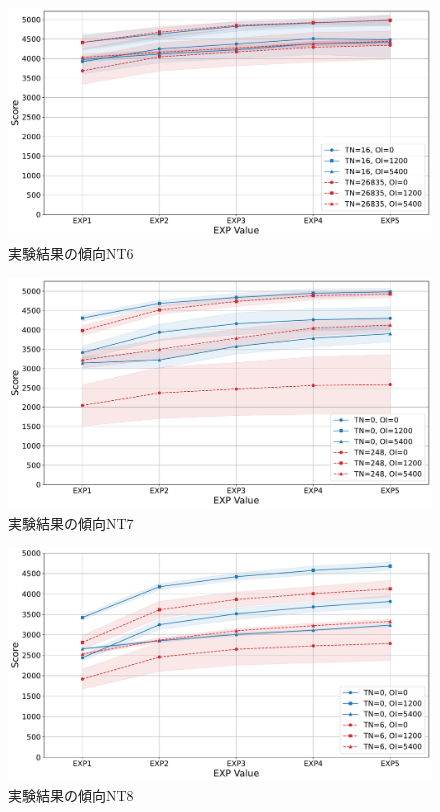\begin{figure}[t]
    \centering
    \includegraphics[width=\linewidth]{pdf/exp_trends/combined_trends_NT6.pdf}
    \caption{実験結果の傾向NT6}
    \label{fig:exp_trendsNT6}
\end{figure}
\begin{figure}[t]
    \centering
    \includegraphics[width=\linewidth]{pdf/exp_trends/combined_trends_NT7.pdf}
    \caption{実験結果の傾向NT7}
    \label{fig:exp_trendsNT7}
\end{figure}
\begin{figure}[t]
    \centering
    \includegraphics[width=\linewidth]{pdf/exp_trends/combined_trends_NT8.pdf}
    \caption{実験結果の傾向NT8}
    \label{fig:exp_trendsNT8}
\end{figure}

